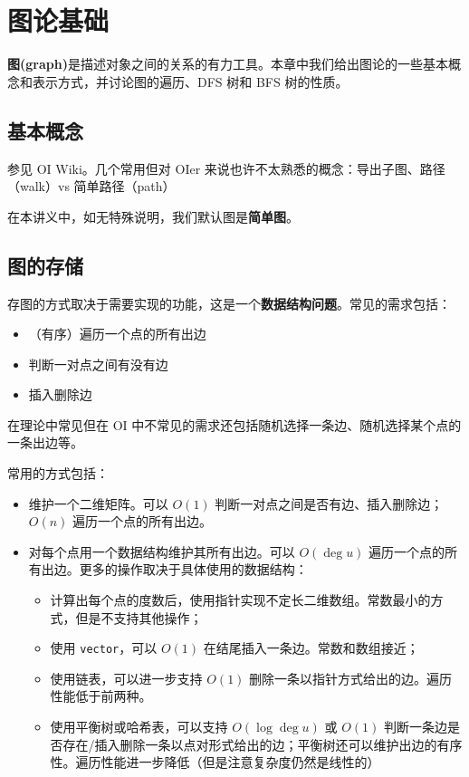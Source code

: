 \chapter{图论基础}

\textbf{图(graph)}是描述对象之间的关系的有力工具。本章中我们给出图论的一些基本概念和表示方式，并讨论图的遍历、DFS 树和 BFS 树的性质。

\section{基本概念}

参见 OI Wiki。几个常用但对 OIer 来说也许不太熟悉的概念：导出子图、路径（walk）vs 简单路径（path） 

在本讲义中，如无特殊说明，我们默认图是\textbf{简单图}。

\section{图的存储}

存图的方式取决于需要实现的功能，这是一个\textbf{数据结构问题}。常见的需求包括：
\begin{itemize}
    \item （有序）遍历一个点的所有出边
    \item 判断一对点之间有没有边
    \item 插入删除边
\end{itemize}
\begin{remark}
    在理论中常见但在 OI 中不常见的需求还包括随机选择一条边、随机选择某个点的一条出边等。
\end{remark}

常用的方式包括：
\begin{itemize}
    \item[邻接矩阵] 维护一个二维矩阵。可以 $O(1)$ 判断一对点之间是否有边、插入删除边；$O(n)$ 遍历一个点的所有出边。
    \item[邻接表] 对每个点用一个数据结构维护其所有出边。可以 $O(\deg u)$ 遍历一个点的所有出边。更多的操作取决于具体使用的数据结构：
        \begin{itemize}
            \item 计算出每个点的度数后，使用指针实现不定长二维数组。常数最小的方式，但是不支持其他操作；
            \item 使用 \texttt{vector}，可以 $O(1)$ 在结尾插入一条边。常数和数组接近；
            \item 使用链表，可以进一步支持 $O(1)$ 删除一条以指针方式给出的边。遍历性能低于前两种。
            \item 使用平衡树或哈希表，可以支持 $O(\log\deg u)$ 或 $O(1)$ 判断一条边是否存在/插入删除一条以点对形式给出的边；平衡树还可以维护出边的有序性。遍历性能进一步降低（但是注意复杂度仍然是线性的）
        \end{itemize}
\end{itemize}


